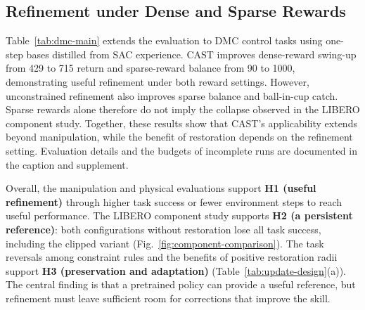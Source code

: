 \subsection{Refinement under Dense and Sparse Rewards}
\label{sec:exp-dmc}


Table~\ref{tab:dmc-main} extends the evaluation to DMC control tasks using one-step bases distilled from SAC experience. CAST improves dense-reward swing-up from 429 to 715 return and sparse-reward balance from 90 to 1000, demonstrating useful refinement under both reward settings. However, unconstrained refinement also improves sparse balance and ball-in-cup catch. Sparse rewards alone therefore do not imply the collapse observed in the LIBERO component study. Together, these results show that CAST's applicability extends beyond manipulation, while the benefit of restoration depends on the refinement setting. Evaluation details and the budgets of incomplete runs are documented in the caption and supplement.

Overall, the manipulation and physical evaluations support \textbf{H1  (useful refinement)} through higher task success or fewer environment steps to reach useful performance. The LIBERO component study supports \textbf{H2  (a persistent reference)}: both configurations without restoration lose all task success, including the clipped variant (Fig.~\ref{fig:component-comparison}). The task reversals among constraint rules and the benefits of positive restoration radii support \textbf{H3  (preservation and adaptation)} (Table~\ref{tab:update-design}(a)). The central finding is that a pretrained policy can provide a useful reference, but refinement must leave sufficient room for corrections that improve the skill.